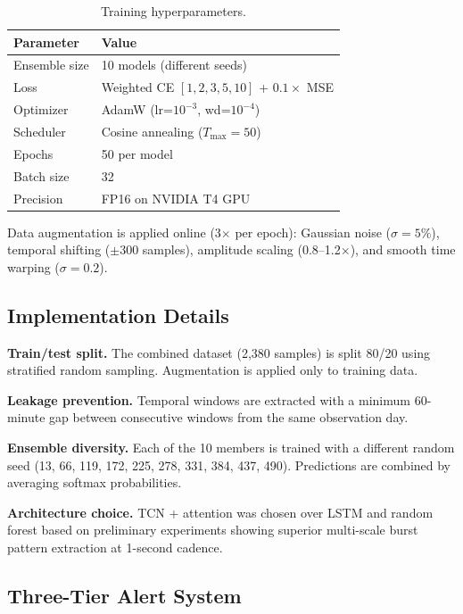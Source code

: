 \documentclass[twocolumn,10pt]{article}
\begin{document}
\begin{table}[htbp]
\centering
\caption{Training hyperparameters.}
\label{tab:training}
\footnotesize
\begin{tabular}{@{}ll@{}}
\toprule
Parameter & Value \\
\midrule
Ensemble size & 10 models (different seeds) \\
Loss & Weighted CE $[1,2,3,5,10]$ + $0.1 \times$ MSE \\
Optimizer & AdamW (lr=$10^{-3}$, wd=$10^{-4}$) \\
Scheduler & Cosine annealing ($T_{\max}=50$) \\
Epochs & 50 per model \\
Batch size & 32 \\
Precision & FP16 on NVIDIA T4 GPU \\
\bottomrule
\end{tabular}
\end{table}

Data augmentation is applied online (3$\times$ per epoch): Gaussian noise ($\sigma = 5\%$), temporal shifting ($\pm300$ samples), amplitude scaling (0.8--1.2$\times$), and smooth time warping ($\sigma=0.2$).

\subsection{Implementation Details}\label{sec:impl}

\textbf{Train/test split.} The combined dataset (2,380 samples) is split 80/20 using stratified random sampling. Augmentation is applied only to training data.

\textbf{Leakage prevention.} Temporal windows are extracted with a minimum 60-minute gap between consecutive windows from the same observation day.

\textbf{Ensemble diversity.} Each of the 10 members is trained with a different random seed (13, 66, 119, 172, 225, 278, 331, 384, 437, 490). Predictions are combined by averaging softmax probabilities.

\textbf{Architecture choice.} TCN + attention was chosen over LSTM and random forest based on preliminary experiments showing superior multi-scale burst pattern extraction at 1-second cadence.

\subsection{Three-Tier Alert System}\label{sec:alerts}
\end{document}
